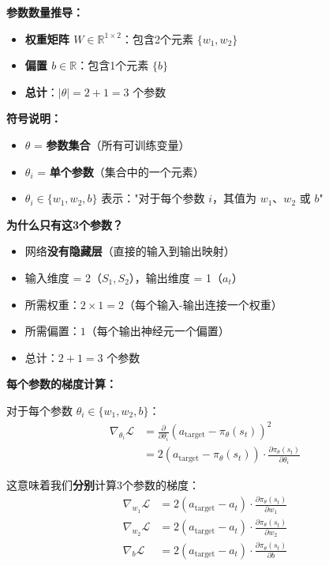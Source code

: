 \documentclass[11pt,a3paper]{ctexart}
\begin{document}
\textbf{参数数量推导：}
\begin{itemize}
    \item \textbf{权重矩阵 $W \in \mathbb{R}^{1 \times 2}$}：包含2个元素 $\{w_1, w_2\}$
    \item \textbf{偏置 $b \in \mathbb{R}$}：包含1个元素 $\{b\}$
    \item \textbf{总计}：$|\theta| = 2 + 1 = 3$ 个参数
\end{itemize}

\textbf{符号说明：}
\begin{itemize}
    \item $\theta$ = \textbf{参数集合}（所有可训练变量）
    \item $\theta_i$ = \textbf{单个参数}（集合中的一个元素）
    \item $\theta_i \in \{w_1, w_2, b\}$ 表示："对于每个参数 $i$，其值为 $w_1$、$w_2$ 或 $b$"
\end{itemize}

\textbf{为什么只有这3个参数？}
\begin{itemize}
    \item 网络\textbf{没有隐藏层}（直接的输入到输出映射）
    \item 输入维度 = 2（$S_1, S_2$），输出维度 = 1（$a_t$）
    \item 所需权重：$2 \times 1 = 2$（每个输入-输出连接一个权重）
    \item 所需偏置：$1$（每个输出神经元一个偏置）
    \item 总计：$2 + 1 = 3$ 个参数
\end{itemize}

\textbf{每个参数的梯度计算：}

对于每个参数 $\theta_i \in \{w_1, w_2, b\}$：
\begin{align}
\nabla_{\theta_i} \mathcal{L} &= \frac{\partial}{\partial \theta_i} (a_{\text{target}} - \pi_\theta(s_t))^2 \\
&= 2(a_{\text{target}} - \pi_\theta(s_t)) \cdot \frac{\partial \pi_\theta(s_t)}{\partial \theta_i}
\end{align}

这意味着我们\textbf{分别}计算3个参数的梯度：
\begin{align}
\nabla_{w_1} \mathcal{L} &= 2(a_{\text{target}} - a_t) \cdot \frac{\partial \pi_\theta(s_t)}{\partial w_1} \\
\nabla_{w_2} \mathcal{L} &= 2(a_{\text{target}} - a_t) \cdot \frac{\partial \pi_\theta(s_t)}{\partial w_2} \\
\nabla_{b} \mathcal{L} &= 2(a_{\text{target}} - a_t) \cdot \frac{\partial \pi_\theta(s_t)}{\partial b}
\end{align}
\end{document}
